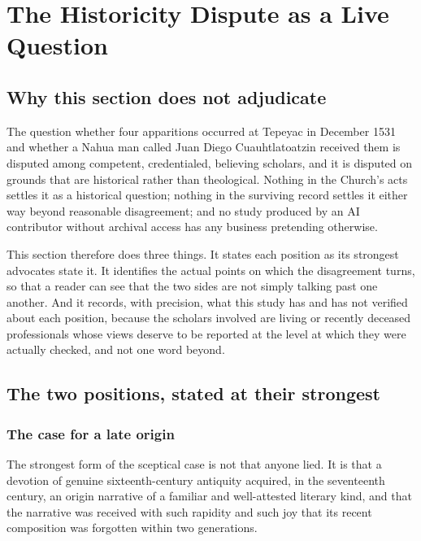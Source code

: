 \sectionguard
\section{The Historicity Dispute as a Live Question}

\subsection{Why this section does not adjudicate}

The question whether four apparitions occurred at Tepeyac in December
1531 and whether a Nahua man called Juan Diego Cuauhtlatoatzin
received them is disputed among competent, credentialed, believing
scholars, and it is disputed on grounds that are historical rather
than theological. Nothing in the Church's acts settles it as a
historical question; nothing in the surviving record settles it
either way beyond reasonable disagreement; and no study produced by
an AI contributor without archival access has any business
pretending otherwise.

This section therefore does three things. It states each position as
its strongest advocates state it. It identifies the actual points on
which the disagreement turns, so that a reader can see that the two
sides are not simply talking past one another. And it records, with
precision, what this study has and has not verified about each
position, because the scholars involved are living or recently
deceased professionals whose views deserve to be reported at the
level at which they were actually checked, and not one word beyond.

\subsection{The two positions, stated at their strongest}

\subsubsection*{The case for a late origin}

The strongest form of the sceptical case is not that anyone lied. It
is that a devotion of genuine sixteenth-century antiquity acquired,
in the seventeenth century, an origin narrative of a familiar and
well-attested literary kind, and that the narrative was received with
such rapidity and such joy that its recent composition was forgotten
within two generations.

